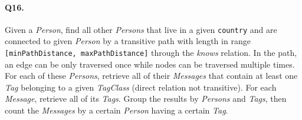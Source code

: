 \paragraph{Q16.}
Given a \emph{Person}, find all other \emph{Persons} that live in a
given \texttt{country} and are connected to given \emph{Person} by a
transitive path with length in range
\texttt{{[}minPathDistance,\ maxPathDistance{]}} through the
\emph{knows} relation.
In the path, an edge can be only traversed once while nodes can be
traversed multiple times.
For each of these \emph{Persons}, retrieve all of their \emph{Messages}
that contain at least one \emph{Tag} belonging to a given
\emph{TagClass} (direct relation not transitive). For each
\emph{Message}, retrieve all of its \emph{Tags}.
Group the results by \emph{Persons} and \emph{Tags}, then count the
\emph{Messages} by a certain \emph{Person} having a certain \emph{Tag}.
